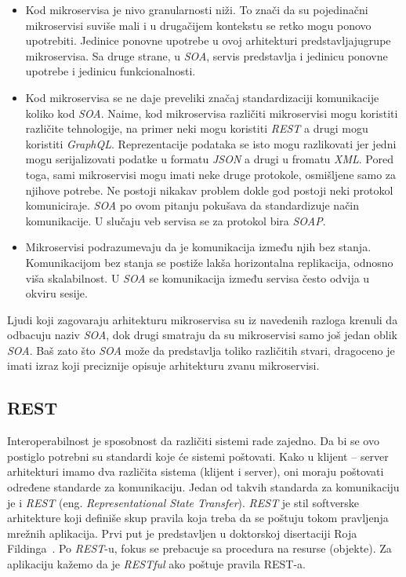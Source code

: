 \begin{itemize}
    \item Kod mikroservisa je nivo granularnosti niži. To znači da su pojedinačni mikroservisi suviše mali i u drugačijem 
    kontekstu se retko mogu ponovo upotrebiti. Jedinice ponovne upotrebe u ovoj arhitekturi predstavljajugrupe mikroservisa.
    Sa druge strane, u \textit{SOA}, servis predstavlja i jedinicu ponovne upotrebe i jedinicu funkcionalnosti.
    \item Kod mikroservisa se ne daje preveliki značaj standardizaciji komunikacije koliko kod \textit{SOA}. Naime, kod mikroservisa
    različiti mikroservisi mogu koristiti različite tehnologije, na primer neki mogu koristiti \textit{REST} a drugi mogu koristiti \textit{GraphQL}.
    Reprezentacije podataka se isto mogu razlikovati jer jedni mogu serijalizovati podatke u formatu \textit{JSON} a drugi u fromatu \textit{XML}.
    Pored toga, sami mikroservisi mogu imati neke druge protokole, osmišljene samo za njihove potrebe. Ne postoji nikakav problem dokle god postoji neki 
    protokol komuniciraje. \textit{SOA} po ovom pitanju pokušava da standardizuje način komunikacije. U slučaju veb servisa se za protokol bira \textit{SOAP}.
    \item Mikroservisi podrazumevaju da je komunikacija između njih bez stanja. Komunikacijom bez stanja se postiže lakša horizontalna replikacija, odnosno 
    viša skalabilnost. U \textit{SOA} se komunikacija između servisa često odvija u okviru sesije.
\end{itemize}		

Ljudi koji zagovaraju arhitekturu mikroservisa su iz navedenih razloga krenuli da odbacuju naziv \textit{SOA}, 
dok drugi smatraju da su mikroservisi samo još jedan oblik \textit{SOA}. Baš zato što \textit{SOA} 
može da predstavlja toliko različitih stvari, dragoceno je imati izraz koji preciznije opisuje arhitekturu 
zvanu mikroservisi.~\cite{martinfowler_microservices}

\subsection{REST}\label{sec:arhitektura-rest}

Interoperabilnost je sposobnost da različiti sistemi rade zajedno. Da bi se ovo postiglo potrebni su 
standardi koje će sistemi poštovati. Kako u klijent -- server arhitekturi imamo dva različita sistema 
(klijent i server), oni moraju poštovati određene standarde za komunikaciju. Jedan od takvih standarda za 
komunikaciju je i \textit{REST} (eng. \textit{Representational State Transfer}). \textit{REST} je stil 
softverske arhitekture koji definiše skup pravila koja treba da se poštuju tokom pravljenja mrežnih 
aplikacija. Prvi put je predstavljen u doktorskoj disertaciji Roja Fildinga~\cite{REST_Roy}. Po \textit{REST}-u, 
fokus se prebacuje sa procedura na resurse (objekte). Za aplikaciju kažemo da je \textit{RESTful} ako poštuje pravila REST-a.


